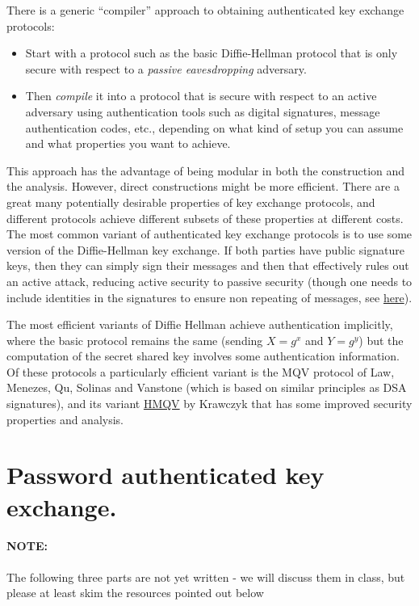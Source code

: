 There is a generic ``compiler'' approach to obtaining authenticated key
exchange protocols:

\begin{itemize}
\item
  Start with a protocol such as the basic Diffie-Hellman protocol that
  is only secure with respect to a \emph{passive eavesdropping}
  adversary.
\item
  Then \emph{compile} it into a protocol that is secure with respect to
  an active adversary using authentication tools such as digital
  signatures, message authentication codes, etc., depending on what kind
  of setup you can assume and what properties you want to achieve.
\end{itemize}

This approach has the advantage of being modular in both the
construction and the analysis. However, direct constructions might be
more efficient. There are a great many potentially desirable properties
of key exchange protocols, and different protocols achieve different
subsets of these properties at different costs. The most common variant
of authenticated key exchange protocols is to use some version of the
Diffie-Hellman key exchange. If both parties have public signature keys,
then they can simply sign their messages and then that effectively rules
out an active attack, reducing active security to passive security
(though one needs to include identities in the signatures to ensure non
repeating of messages, see
\href{http://link.springer.com/article/10.1007\%2FBF00124891}{here}).

The most efficient variants of Diffie Hellman achieve authentication
implicitly, where the basic protocol remains the same (sending \(X=g^x\)
and \(Y=g^y\)) but the computation of the secret shared key involves
some authentication information. Of these protocols a particularly
efficient variant is the MQV protocol of Law, Menezes, Qu, Solinas and
Vanstone (which is based on similar principles as DSA signatures), and
its variant \href{https://eprint.iacr.org/2005/176.pdf}{HMQV} by
Krawczyk that has some improved security properties and analysis.

\section{Password authenticated key
exchange.}\label{12-Password-authenticated}

\paragraph{NOTE:} The following three parts are not yet written - we
will discuss them in class, but please at least skim the resources
pointed out below

